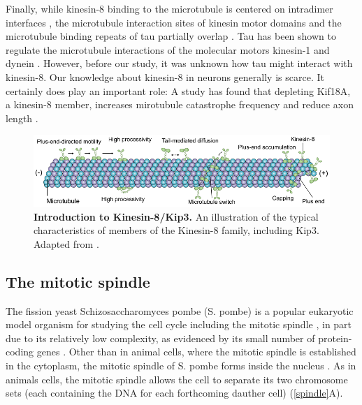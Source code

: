 Finally, while kinesin-8 binding to the microtubule is centered on intradimer interfaces , the microtubule interaction sites of kinesin motor domains and the microtubule binding repeats of tau partially overlap \parencite{Kellogg2018}. Tau has been shown to regulate the microtubule interactions of the molecular motors kinesin-1 and dynein \parencite{Chaudhary2018,Dixit2008,ebneth1998overexpression,seitz2002single,trinczek1999tau,vershinin2007multiple}. However, before our study, it was unknown how tau might interact with kinesin-8. Our knowledge about kinesin-8 in neurons generally is scarce. It certainly does play an important role: A study has found that depleting Kif18A, a kinesin-8 member, increases mirotubule catastrophe frequency and reduce axon length \parencite{KEVENAAR2016849}.

\begin{figure}[h!tb]
\centering
\includegraphics[width=\linewidth]{Figures/kip3.png}
\caption[Introduction to Kinesin-8/Kip3.]{\textbf{Introduction to Kinesin-8/Kip3.}
An illustration of the typical characteristics of members of the Kinesin-8 family, including Kip3. Adapted from \cite{Lin2020}.
	}\label{kip3}
\end{figure}

\subsection{The mitotic spindle}
\label{sec:spindle}
The fission yeast Schizosaccharomyces pombe (S. pombe) is a popular eukaryotic model organism for studying the cell cycle including the mitotic spindle \parencite{Vyas2021, Uzsoy2021}, in part due to its relatively low complexity, as evidenced by its small number of protein-coding genes \parencite{Wood2002}. Other than in animal cells, where the mitotic spindle is established in the cytoplasm, the mitotic spindle of S. pombe forms inside the nucleus \parencite{Kilmartin2014}. As in animals cells, the mitotic spindle allows the cell to separate its two chromosome sets (each containing the DNA for each forthcoming dauther cell) (\autoref{spindle}A).

